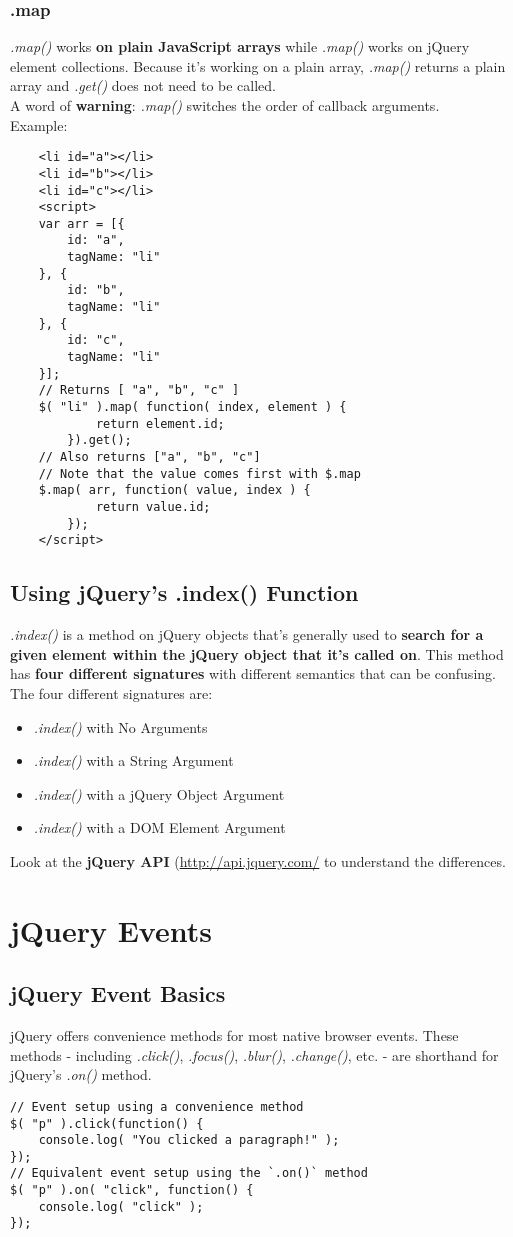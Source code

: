 \documentclass[10pt,letterpaper]{report}
\begin{document}
\subsection{\textdollar.map} 
\textit{\textdollar.map()} works \textbf{on plain JavaScript arrays} while \textit{.map()} works on jQuery element collections. Because it's working on a plain array, \textit{\textdollar.map()} returns a plain array and \textit{.get()} does not need to be called.\\
A word of \textbf{warning}: \textit{\textdollar.map()} switches the order of callback arguments.\\
Example:
\begin{lstlisting}
	<li id="a"></li>
	<li id="b"></li>
	<li id="c"></li>
	<script>
	var arr = [{
		id: "a",
		tagName: "li"
	}, {
		id: "b",
		tagName: "li"
	}, {
		id: "c",
		tagName: "li"
	}];
	// Returns [ "a", "b", "c" ]
	$( "li" ).map( function( index, element ) {
			return element.id;
		}).get();
	// Also returns ["a", "b", "c"]
	// Note that the value comes first with $.map
	$.map( arr, function( value, index ) {
			return value.id;
		});
	</script>
\end{lstlisting}
\section{Using jQuery's .index() Function}
\textit{.index()} is a method on jQuery objects that's generally used to \textbf{search for a given element within the jQuery object that it's called on}. This method has \textbf{four different signatures} with different semantics that can be confusing.\\
The four different signatures are:
\begin{itemize}
\item \textit{.index()} with No Arguments
\item \textit{.index()} with a String Argument
\item \textit{.index()} with a jQuery Object Argument
\item \textit{.index()} with a DOM Element Argument
\end{itemize}
Look at the \textbf{jQuery API} (\url{http://api.jquery.com/} to understand the differences.
\chapter{jQuery Events}
\section{jQuery Event Basics}
jQuery offers convenience methods for most native browser events. These methods - including \textit{.click()}, \textit{.focus()}, \textit{.blur()}, \textit{.change()}, etc. - are shorthand for jQuery's \textit{.on()} method.
\begin{lstlisting}
// Event setup using a convenience method
$( "p" ).click(function() {
	console.log( "You clicked a paragraph!" );
});
// Equivalent event setup using the `.on()` method
$( "p" ).on( "click", function() {
	console.log( "click" );
});
\end{lstlisting}
\end{document}
